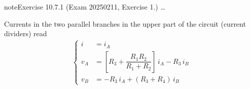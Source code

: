 \documentclass[letterpaper,10pt,italian]{jupyterBook}
\begin{document}
\begin{sphinxadmonition}{note}{Exercise 10.7.1 (Exam 2025\sphinxhyphen{}02\sphinxhyphen{}11, Exercise 1.)}
\sphinxAtStartPar
{} …



\sphinxAtStartPar
Currents in the two parallel branches in the upper part of the circuit (current dividers) read
\begin{equation*}
\begin{split}\begin{cases}
  i   & = i_A \\
  v_A & = \left[ R_3 + \dfrac{R_1 R_2}{R_1 + R_2} \right] \, i_A - R_3 \, i_B \\
  v_B & = -R_3 \, i_A + (R_3 + R_4) \, i_B
\end{cases}\end{split}
\end{equation*}
\begin{figure}[htbp]
\centering

\noindent{}
\end{figure}


\end{sphinxadmonition}
\end{document}
